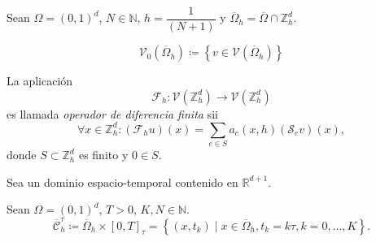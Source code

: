 \begin{definition}
    Sean
    \begin{math}
        \Omega=
        {\left(0,1\right)}^{d}
    \end{math},
    \begin{math}
        N\in\mathbb{N}
    \end{math},
    \begin{math}
        h=
        \dfrac{1}{\left(N+1\right)}
    \end{math}
    y
    \begin{math}
        \overline{\Omega}_{h}=
        \overline{\Omega}\cap
        \mathbb{Z}^{d}_{h}
    \end{math}.

    \begin{equation*}
        \mathcal{V}_{0}\left(\overline{\Omega}_{h}\right)\coloneqq
        \left\{
        v\in\mathcal{V}\left(\overline{\Omega}_{h}\right)
        \right\}
    \end{equation*}
\end{definition}

\begin{definition}
    La aplicación
    \begin{equation*}
        \mathcal{F}_{h}\colon
        \mathcal{V}\left(\mathbb{Z}^{d}_{h}\right)\to
        \mathcal{V}\left(\mathbb{Z}^{d}_{h}\right)
    \end{equation*}
    es llamada \emph{operador de diferencia finita} sii
    \begin{equation*}
        \forall x\in\mathbb{Z}^{d}_{h}:
        \left(\mathcal{F}_{h}u\right)\left(x\right)=
        \sum_{e\in S}
        a_{e}\left(x,h\right)
        \left(\mathcal{S}_{e}v\right)
        \left(x\right),
    \end{equation*}
    donde $S\subset\mathbb{Z}^{d}_{h}$ es finito y $0\in S$.
\end{definition}

Sea un dominio espacio-temporal contenido en $\mathbb{R}^{d+1}$.

\begin{definition}
    Sean
    \begin{math}
        \Omega=
        {\left(0,1\right)}^{d}
    \end{math},
    $T>0$, $K,N\in\mathbb{N}$.
    \begin{equation*}
        \overline{\mathcal{C}}^{\tau}_{h}\coloneqq
        \overline{\Omega}_{h}
        \times
        {\left[0,T\right]}_{\tau}=
        \left\{
        \left(x,t_{k}\right)\mid
        x\in\overline{\Omega}_{h},
        t_{k}=k\tau,
        k=0,\dotsc, K
        \right\}.
    \end{equation*}
\end{definition}

